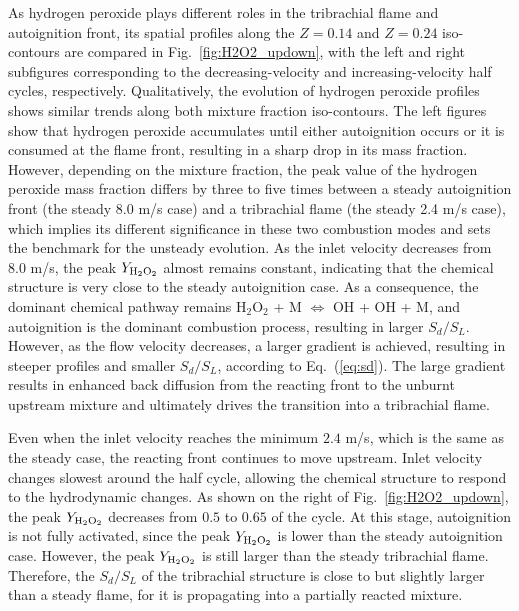 \documentclass[review,3p,times]{elsarticle}
\begin{document}
\textcolor{Rev1}{As hydrogen peroxide plays different roles in the tribrachial flame and autoignition front, its spatial profiles along the $Z = 0.14$ and $Z = 0.24$ iso-contours are compared in Fig.~\ref{fig:H2O2_updown}, with the left and right subfigures corresponding to the decreasing-velocity and increasing-velocity half cycles, respectively.  Qualitatively, the evolution of hydrogen peroxide profiles shows similar trends along both mixture fraction iso-contours.  The left figures show that hydrogen peroxide accumulates until either autoignition occurs or it is consumed at the flame front, resulting in a sharp drop in its mass fraction.  However, depending on the mixture fraction, the peak value of the hydrogen peroxide mass fraction differs by three to five times between a steady autoignition front (the steady 8.0 m/s case) and a tribrachial flame (the steady 2.4 m/s case), which implies its different significance in these two combustion modes and sets the benchmark for the unsteady evolution.}  As the inlet velocity decreases from $8.0$ m/s, the peak $Y_{\rm H{_2}O{_2}}$ almost remains constant, indicating that the chemical structure is very close to the steady autoignition case.  As a consequence, the dominant chemical pathway remains H$_2$O$_2$ + M $\Longleftrightarrow$ OH + OH + M, and autoignition is the dominant combustion process, resulting in larger $S_d/S_L$.  However, as the flow velocity decreases, a larger gradient is achieved, resulting in steeper profiles and smaller $S_d/S_L$, according to Eq.~(\ref{eq:sd}).  \textcolor{Rev1}{The large gradient results in enhanced back diffusion from the reacting front to the unburnt upstream mixture and ultimately drives the transition into a tribrachial flame.}       

Even when the inlet velocity reaches the minimum $2.4$ m/s, which is the same as the steady case, the reacting front continues to move upstream.  Inlet velocity changes slowest around the half cycle, allowing the chemical structure to respond to the hydrodynamic changes.  As shown on the right of Fig.~\ref{fig:H2O2_updown}, the peak $Y_{\rm H{_2}O{_2}}$ decreases from $0.5$ to $0.65$ of the cycle.  At this stage, autoignition is not fully activated, since the peak $Y_{\rm H{_2}O{_2}}$ is lower than the steady autoignition case.  However, the peak $Y_{\rm H{_2}O{_2}}$ is still larger than the steady tribrachial flame.  Therefore, the $S_d/S_L$ of the tribrachial structure is close to but slightly larger than a steady flame, for it is propagating into a partially reacted mixture.  
\end{document}
